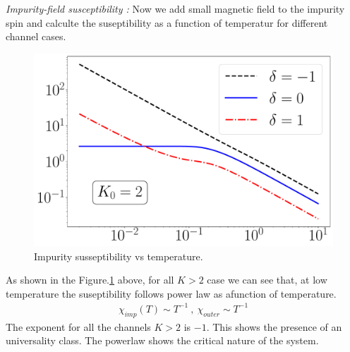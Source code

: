 \documentclass[reprint,prb,superscriptaddress]{revtex4-2}
\begin{document}
\textit{Impurity-field susceptibility :} Now we add small magnetic field to the impurity spin and calculte the suseptibility as a function of temperatur for different channel cases.
\begin{figure}[!htpb]
\centering
\includegraphics[scale=0.36]{plt/Central_Field_Chi_Powerlaw_}
\caption{Impurity susseptibility vs temperature.}
\label{fig:suseptibility_impurity}
\end{figure}
As shown in the Figure.\ref{fig:suseptibility_impurity} above, for all $K>2$ case we can see that, at low temperature the suseptibility follows power law as afunction of temperature. 
\begin{eqnarray}
\chi_{imp}(T) \sim T^{-1} ~,~ \chi_{outer} \sim T^{-1}
\end{eqnarray}
The exponent for all the channels $K>2$ is $-1$. This shows the presence of an universality class. The powerlaw shows the critical nature of the system.
\end{document}
